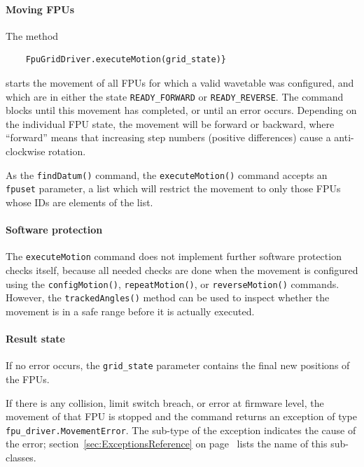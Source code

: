 \documentclass[fontsize=12,a4paper]{scrreprt}
\begin{document}
\paragraph{Moving FPUs}

\begin{sloppypar}
  The method
  \begin{verbatim}
    FpuGridDriver.executeMotion(grid_state)}
  \end{verbatim}
  starts the movement of all FPUs for which a valid wavetable was
  configured, and which are in either the state
  \texttt{READY\_FORWARD} or \texttt{READY\_REVERSE}. The command
  blocks until this movement has completed, or until an error
  occurs. Depending on the individual FPU state, the movement will be
  forward or backward, where ``forward'' means that increasing step
  numbers (positive differences) cause a anti-clockwise rotation.
\end{sloppypar}

As the \texttt{findDatum()} command, the \texttt{executeMotion()}
command accepts an \texttt{fpuset} parameter, a list which will
restrict the movement to only those FPUs whose IDs are elements of the
list.

\paragraph{Software protection}
The \texttt{executeMotion} command does not implement further software
protection checks itself, because all needed checks are done when the
movement is configured using the \texttt{configMotion()},
\texttt{repeatMotion()}, or \texttt{reverseMotion()}
commands. However, the \texttt{trackedAngles()} method can be used to
inspect whether the movement is in a safe range before it is actually
executed.

\paragraph{Result state}
If no error occurs, the \texttt{grid\_state} parameter contains the
final new positions of the FPUs.

If there is any collision, limit switch breach, or error at firmware
level, the movement of that FPU is stopped and the command returns an
exception of type \texttt{fpu\_driver.MovementError}. The sub-type of
the exception indicates the cause of the error;
section~\ref{sec:ExceptionsReference} on
page~\pageref{sec:ExceptionsReference} lists the name of this
sub-classes.
\end{document}
